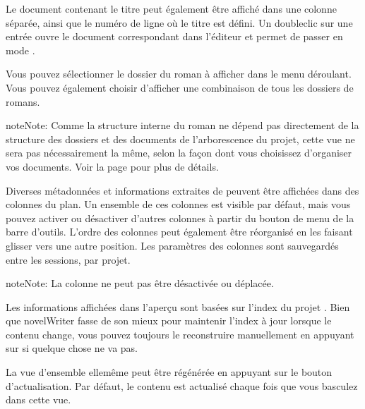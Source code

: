 \documentclass[a4paper,11pt,french]{sphinxmanual}
\begin{document}
\sphinxAtStartPar
Le document contenant le titre peut également être affiché dans une colonne séparée, ainsi que le numéro de ligne où le titre est défini. Un double\sphinxhyphen{}clic sur une entrée ouvre le document correspondant dans l’éditeur et permet de passer en mode .

\sphinxAtStartPar
Vous pouvez sélectionner le dossier du roman à afficher dans le menu déroulant. Vous pouvez également choisir d’afficher une combinaison de tous les dossiers de romans.

\begin{sphinxadmonition}{note}{Note:}
\sphinxAtStartPar
Comme la structure interne du roman ne dépend pas directement de la structure des dossiers et des documents de l’arborescence du projet, cette vue ne sera pas nécessairement la même, selon la façon dont vous choisissez d’organiser vos documents. Voir la page {\hyperref[\detokenize{project_structure:a-struct}]{}} pour plus de détails.
\end{sphinxadmonition}

\sphinxAtStartPar
Diverses métadonnées et informations extraites de {\hyperref[\detokenize{int_glossary:term-Tag}]{}} peuvent être affichées dans des colonnes du plan. Un ensemble de ces colonnes est visible par défaut, mais vous pouvez activer ou désactiver d’autres colonnes à partir du bouton de menu de la barre d’outils. L’ordre des colonnes peut également être réorganisé en les faisant glisser vers une autre position. Les paramètres des colonnes sont sauvegardés entre les sessions, par projet.

\begin{sphinxadmonition}{note}{Note:}
\sphinxAtStartPar
La colonne  ne peut pas être désactivée ou déplacée.
\end{sphinxadmonition}

\sphinxAtStartPar
Les informations affichées dans l’aperçu sont basées sur l’index du projet {\hyperref[\detokenize{int_glossary:term-Project-Index}]{}}. Bien que novelWriter fasse de son mieux pour maintenir l’index à jour lorsque le contenu change, vous pouvez toujours le reconstruire manuellement en appuyant sur  si quelque chose ne va pas.

\sphinxAtStartPar
La vue d’ensemble elle\sphinxhyphen{}même peut être régénérée en appuyant sur le bouton d’actualisation. Par défaut, le contenu est actualisé chaque fois que vous basculez dans cette vue.
\end{document}
